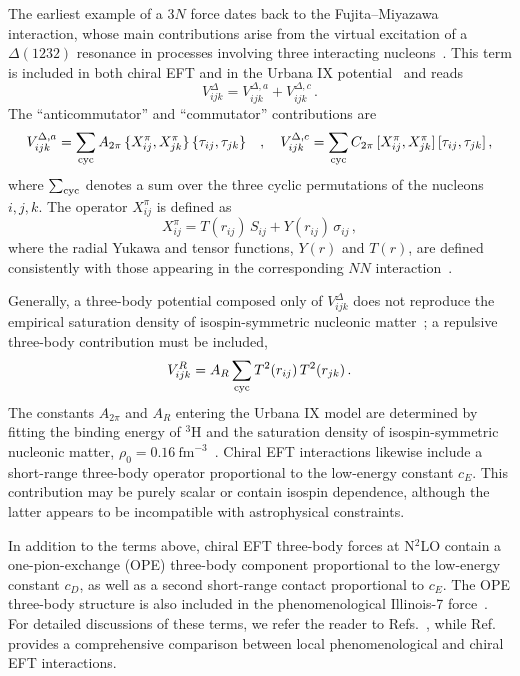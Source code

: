 The earliest example of a $3N$ force dates back to the Fujita--Miyazawa interaction, whose main contributions arise from the virtual excitation of a $\Delta(1232)$ resonance in processes involving three interacting nucleons~\cite{fujita_pion_1957}. This term is included in both chiral EFT and in the Urbana IX potential~\cite{pudliner_quantum_1995} and reads 
\begin{equation}
V_{ijk}^\Delta = V_{ijk}^{\Delta,a} + V_{ijk}^{\Delta,c}\, .
\end{equation}
The ``anticommutator'' and ``commutator'' contributions are  
\begin{equation}
V_{ijk}^{\Delta,a} = \sum_{\rm cyc} 
A_{2\pi}\,\{X_{ij}^\pi, X_{jk}^\pi\}\,\{\tau_{ij}, \tau_{jk}\} \quad , \quad 
V_{ijk}^{\Delta,c} = \sum_{\rm cyc} 
C_{2\pi}\,[X_{ij}^\pi, X_{jk}^\pi]\,[\tau_{ij}, \tau_{jk}]\,,
\end{equation}
where $\sum_{\rm cyc}$ denotes a sum over the three cyclic permutations of the nucleons $i,j,k$.  
The operator $X_{ij}^\pi$ is defined as 
\begin{equation}
X_{ij}^\pi = T(r_{ij})\, S_{ij} + Y(r_{ij})\,\sigma_{ij}\,,
\end{equation}
where the radial Yukawa and tensor functions, $Y(r)$ and $T(r)$, are defined consistently with those appearing in the corresponding $NN$ interaction~\cite{wiringa_accurate_1995,pudliner_quantum_1997}.

Generally, a three-body potential composed only of $V_{ijk}^\Delta$ does not reproduce the empirical saturation density of isospin-symmetric nucleonic matter~\cite{lagaris_variational_1981}; a repulsive three-body contribution must be included,
\begin{equation}
V^{R}_{ijk} = A_R \sum_{\rm cyc} T^2(r_{ij})\, T^2(r_{jk}) \,.
\end{equation}
The constants $A_{2\pi}$ and $A_R$ entering the Urbana IX model are determined by fitting the binding energy of ${}^3$H and the saturation density of isospin-symmetric nucleonic matter, $\rho_0 = 0.16~\mathrm{fm}^{-3}$~\cite{Akmal:1998cf}.  
Chiral EFT interactions likewise include a short-range three-body operator proportional to the low-energy constant $c_E$. This contribution may be purely scalar or contain isospin dependence, although the latter appears to be incompatible with astrophysical constraints.

In addition to the terms above, chiral EFT three-body forces at N$^2$LO contain a one-pion-exchange (OPE) three-body component proportional to the low-energy constant $c_D$, as well as a second short-range contact proportional to $c_E$. The OPE three-body structure is also included in the phenomenological Illinois-7 force~\cite{pieper_illinois_2008}. For detailed discussions of these terms, we refer the reader to Refs.~\cite{lynn_quantum_2017}, while Ref.~\cite{lovato_comparative_2012} provides a comprehensive comparison between local phenomenological and chiral EFT interactions.


